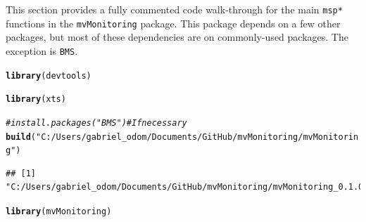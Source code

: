 \documentclass{report}\usepackage[]{graphicx}\usepackage[]{color}
\makeatletter
\newcommand{\hlstr}[1]{\textcolor[rgb]{0.192,0.494,0.8}{#1}}%
\newcommand{\hlcom}[1]{\textcolor[rgb]{0.678,0.584,0.686}{\textit{#1}}}%
\newcommand{\hlstd}[1]{\textcolor[rgb]{0.345,0.345,0.345}{#1}}%
\newcommand{\hlkwd}[1]{\textcolor[rgb]{0.737,0.353,0.396}{\textbf{#1}}}%
\newenvironment{kframe}{%
 \def\at@end@of@kframe{}%
 \ifinner\ifhmode%
  \def\at@end@of@kframe{\end{minipage}}%
  \begin{minipage}{\columnwidth}%
 \fi\fi%
 \def\FrameCommand##1{\hskip\@totalleftmargin \hskip-\fboxsep
 \colorbox{shadecolor}{##1}\hskip-\fboxsep
     \hskip-\linewidth \hskip-\@totalleftmargin \hskip\columnwidth}%
 \MakeFramed {\advance\hsize-\width
   \@totalleftmargin\z@ \linewidth\hsize
   \@setminipage}}%
 {\par\unskip\endMakeFramed%
 \at@end@of@kframe}
\newenvironment{knitrout}{}{} %
\makeatother
\begin{document}
This section provides a fully commented code walk-through for the main \texttt{msp*} functions in the \texttt{mvMonitoring} package. This package depends on a few other packages, but most of these dependencies are on commonly-used packages. The exception is \texttt{BMS}.
\begin{knitrout}
\color{fgcolor}\begin{kframe}
\begin{alltt}
\hlkwd{library}\hlstd{(devtools)}
\end{alltt}


{\ttfamily\noindent\color{warningcolor}{\#\# Warning: package 'devtools' was built under R version 3.4.1}}\begin{alltt}
\hlkwd{library}\hlstd{(xts)}
\end{alltt}


{\ttfamily\noindent\color{warningcolor}{\#\# Warning: package 'xts' was built under R version 3.4.1}}

{\ttfamily\noindent\itshape\color{messagecolor}{\#\# Loading required package: zoo}}

{\ttfamily\noindent\itshape\color{messagecolor}{\#\# \\\#\# Attaching package: 'zoo'}}

{\ttfamily\noindent\itshape\color{messagecolor}{\#\# The following objects are masked from 'package:base':\\\#\# \\\#\#\ \ \ \  as.Date, as.Date.numeric}}\begin{alltt}
\hlcom{# install.packages("BMS") # If necessary}
\hlkwd{build}\hlstd{(}\hlstr{"C:/Users/gabriel_odom/Documents/GitHub/mvMonitoring/mvMonitoring"}\hlstd{)}
\end{alltt}


{\ttfamily\noindent\itshape{}}

{\ttfamily\noindent\itshape\color{messagecolor}{\#\# }}\begin{verbatim}
## [1] "C:/Users/gabriel_odom/Documents/GitHub/mvMonitoring/mvMonitoring_0.1.0.tar.gz"
\end{verbatim}
\begin{alltt}
\hlkwd{library}\hlstd{(mvMonitoring)}
\end{alltt}
\end{kframe}
\end{knitrout}
\end{document}
